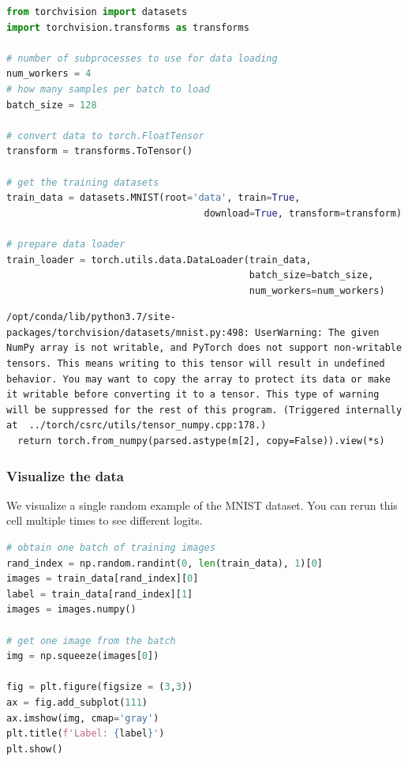 \begin{lstlisting}[language=Python]
from torchvision import datasets
import torchvision.transforms as transforms

# number of subprocesses to use for data loading
num_workers = 4
# how many samples per batch to load
batch_size = 128

# convert data to torch.FloatTensor
transform = transforms.ToTensor()

# get the training datasets
train_data = datasets.MNIST(root='data', train=True,
                                   download=True, transform=transform)

# prepare data loader
train_loader = torch.utils.data.DataLoader(train_data, 
                                           batch_size=batch_size,
                                           num_workers=num_workers)
\end{lstlisting}

\begin{lstlisting}
/opt/conda/lib/python3.7/site-packages/torchvision/datasets/mnist.py:498: UserWarning: The given NumPy array is not writable, and PyTorch does not support non-writable tensors. This means writing to this tensor will result in undefined behavior. You may want to copy the array to protect its data or make it writable before converting it to a tensor. This type of warning will be suppressed for the rest of this program. (Triggered internally at  ../torch/csrc/utils/tensor_numpy.cpp:178.)
  return torch.from_numpy(parsed.astype(m[2], copy=False)).view(*s)
\end{lstlisting}

\subsubsection{Visualize the data}

We visualize a single random example of the MNIST dataset. You can rerun
this cell multiple times to see different logits.

\begin{lstlisting}[language=Python]
# obtain one batch of training images
rand_index = np.random.randint(0, len(train_data), 1)[0]
images = train_data[rand_index][0]
label = train_data[rand_index][1]
images = images.numpy()

# get one image from the batch
img = np.squeeze(images[0])

fig = plt.figure(figsize = (3,3)) 
ax = fig.add_subplot(111)
ax.imshow(img, cmap='gray')
plt.title(f'Label: {label}')
plt.show()
\end{lstlisting}


